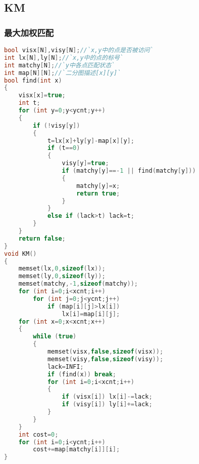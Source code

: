 \subsection{KM}
    \subsubsection{最大加权匹配}
	\begin{lstlisting}[language=c++]
bool visx[N],visy[N];//`x,y中的点是否被访问`
int lx[N],ly[N];//`x,y中的点的标号`
int matchy[N];//`y中各点匹配状态`
int map[N][N];//`二分图描述[x][y]`
bool find(int x)
{
	visx[x]=true;
	int t;
	for (int y=0;y<ycnt;y++)
	{
		if (!visy[y])
		{
			t=lx[x]+ly[y]-map[x][y];
			if (t==0)
			{
				visy[y]=true;
				if (matchy[y]==-1 || find(matchy[y]))
				{
					matchy[y]=x;
					return true;
				}
			}
			else if (lack>t) lack=t;
		}
	}
	return false;
}
void KM()
{
	memset(lx,0,sizeof(lx));
	memset(ly,0,sizeof(ly));
	memset(matchy,-1,sizeof(matchy));
	for (int i=0;i<xcnt;i++)
		for (int j=0;j<ycnt;j++)
			if (map[i][j]>lx[i])
				lx[i]=map[i][j];
	for (int x=0;x<xcnt;x++)
	{
		while (true)
		{
			memset(visx,false,sizeof(visx));
			memset(visy,false,sizeof(visy));
			lack=INFI;
			if (find(x)) break;
			for (int i=0;i<xcnt;i++)
			{
				if (visx[i]) lx[i]-=lack;
				if (visy[i]) ly[i]+=lack;
			}
		}
	}
	int cost=0;
	for (int i=0;i<ycnt;i++)
		cost+=map[matchy[i]][i];
}
	\end{lstlisting}

